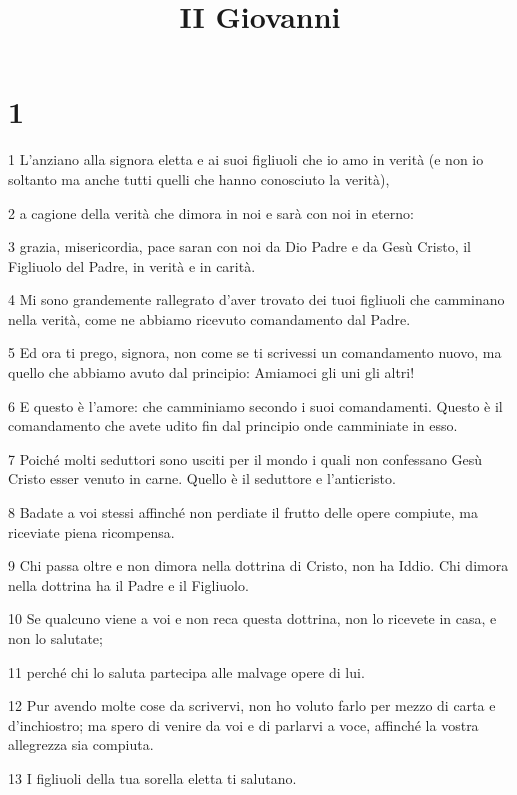 

\title{II Giovanni}


\chapter{1}

\par 1 L'anziano alla signora eletta e ai suoi figliuoli che io amo in verità (e non io soltanto ma anche tutti quelli che hanno conosciuto la verità),
\par 2 a cagione della verità che dimora in noi e sarà con noi in eterno:
\par 3 grazia, misericordia, pace saran con noi da Dio Padre e da Gesù Cristo, il Figliuolo del Padre, in verità e in carità.
\par 4 Mi sono grandemente rallegrato d'aver trovato dei tuoi figliuoli che camminano nella verità, come ne abbiamo ricevuto comandamento dal Padre.
\par 5 Ed ora ti prego, signora, non come se ti scrivessi un comandamento nuovo, ma quello che abbiamo avuto dal principio: Amiamoci gli uni gli altri!
\par 6 E questo è l'amore: che camminiamo secondo i suoi comandamenti. Questo è il comandamento che avete udito fin dal principio onde camminiate in esso.
\par 7 Poiché molti seduttori sono usciti per il mondo i quali non confessano Gesù Cristo esser venuto in carne. Quello è il seduttore e l'anticristo.
\par 8 Badate a voi stessi affinché non perdiate il frutto delle opere compiute, ma riceviate piena ricompensa.
\par 9 Chi passa oltre e non dimora nella dottrina di Cristo, non ha Iddio. Chi dimora nella dottrina ha il Padre e il Figliuolo.
\par 10 Se qualcuno viene a voi e non reca questa dottrina, non lo ricevete in casa, e non lo salutate;
\par 11 perché chi lo saluta partecipa alle malvage opere di lui.
\par 12 Pur avendo molte cose da scrivervi, non ho voluto farlo per mezzo di carta e d'inchiostro; ma spero di venire da voi e di parlarvi a voce, affinché la vostra allegrezza sia compiuta.
\par 13 I figliuoli della tua sorella eletta ti salutano.


